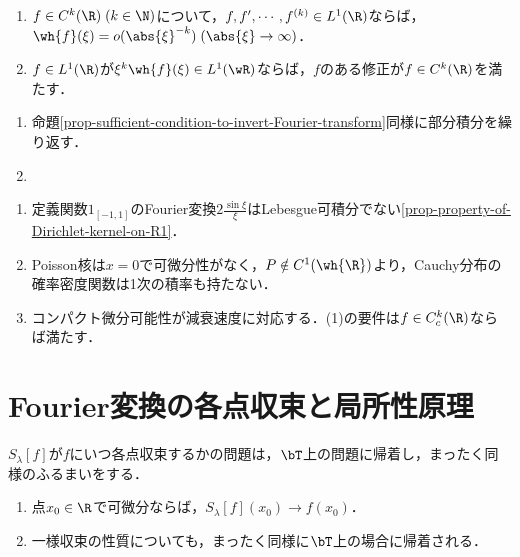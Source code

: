 \documentclass[uplatex,dvipdfmx]{jsreport}
\begin{document}
\begin{proposition}\mbox{}
    \begin{enumerate}
        \item $f\in C^k(\R)\;(k\in\N)$について，$f,f',\cdots,f^{(k)}\in L^1(\R)$ならば，$\wh{f}(\xi)=o(\abs{\xi}^{-k})\;(\abs{\xi}\to\infty)$．
        \item $f\in L^1(\R)$が$\xi^k\wh{f}(\xi)\in L^1(\wR)$ならば，$f$のある修正が$f\in C^k(\R)$を満たす．
    \end{enumerate}
\end{proposition}
\begin{Proof}\mbox{}
    \begin{enumerate}
        \item 命題\ref{prop-sufficient-condition-to-invert-Fourier-transform}同様に部分積分を繰り返す．
        \item 
    \end{enumerate}
\end{Proof}
\begin{example}[可微分性と減衰速度の対応の例]\mbox{}
    \begin{enumerate}
        \item 定義関数$1_{[-1,1]}$のFourier変換$2\frac{\sin\xi}{\xi}$はLebesgue可積分でない\ref{prop-property-of-Dirichlet-kernel-on-R1}．
        \item Poisson核は$x=0$で可微分性がなく，$P\notin C^1(\wh{\R})$より，Cauchy分布の確率密度関数は1次の積率も持たない．
        \item コンパクト微分可能性が減衰速度に対応する．(1)の要件は$f\in C_c^k(\R)$ならば満たす．
    \end{enumerate}
\end{example}

\section{Fourier変換の各点収束と局所性原理}

\begin{tcolorbox}[colframe=ForestGreen, colback=ForestGreen!10!white,breakable,colbacktitle=ForestGreen!40!white,coltitle=black,fonttitle=\bfseries\sffamily,
title=]
    $S_\lambda[f]$が$f$にいつ各点収束するかの問題は，$\bT$上の問題に帰着し，まったく同様のふるまいをする．
    \begin{enumerate}
        \item 点$x_0\in\R$で可微分ならば，$S_\lambda[f](x_0)\to f(x_0)$．
        \item 一様収束の性質についても，まったく同様に$\bT$上の場合に帰着される．
    \end{enumerate}
\end{tcolorbox}
\end{document}
